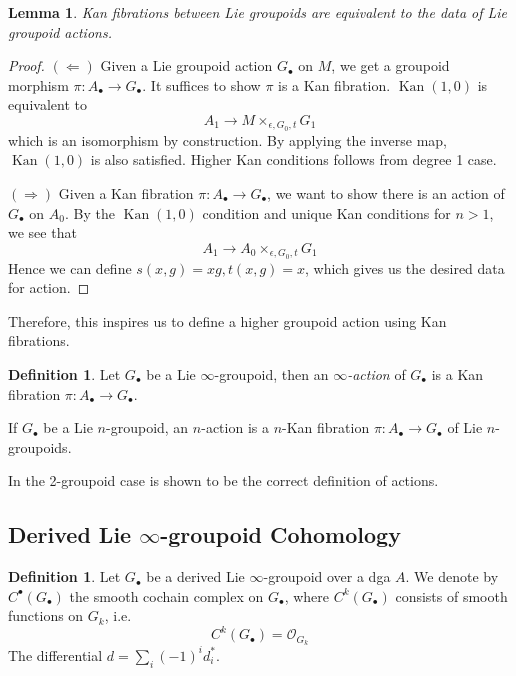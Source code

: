 \documentclass[12pt]{amsart}
\newtheorem{lem}[thm]{Lemma}
\theoremstyle{definition}
\newtheorem{defn}[thm]{Definition}
\theoremstyle{remark}
\numberwithin{equation}{section}
\newcommand{\CO}{{\mathcal O}}
\newcommand{\1}{{\mathbb{1}}}
\newcommand{\bt}{\bullet}
\newcommand{\kan}{\operatorname{Kan}}
\newcommand{\pr}{{\operatorname{pr}}}
\begin{document}
    	\begin{center}
\end{center}
\begin{lem}
    Kan fibrations between Lie groupoids are equivalent to the data of Lie groupoid actions.
\end{lem}
\begin{proof}
    $(\Leftarrow)$ Given a Lie groupoid action $G_{\bt}$ on $M$, we get a groupoid morphism $\pi: A_{\bt} \to G_{\bt}$. It suffices to show $\pi$ is a Kan fibration. $\kan(1,0)$ is equivalent to 
    $$A_1 \to M\times_{\epsilon, G_0, t} G_1
    $$
    which is an isomorphism by construction. By applying the inverse map, $\kan(1,0)$ is also satisfied. Higher Kan conditions follows from degree 1 case.
    
    $(\Rightarrow)$ Given a Kan fibration $\pi: A_{\bt} \to G_{\bt}$, we want to show there is an action of $G_{\bt}$ on $A_0$. By the $\kan(1,0)$ condition and unique Kan conditions for $n > 1$, we see that 
    $$A_1 \to A_0\times_{\epsilon, G_0, t} G_1$$
    Hence we can define $s(x, g) = xg, t(x, g) = x$, which gives us the desired data for  action.
\end{proof}
Therefore, this inspires us to define a higher groupoid action using Kan fibrations.

\begin{defn}
    Let $G_{\bt}$ be a Lie $\infty$-groupoid, then an {\it $\infty$-action} of $G_{\bt}$ is a Kan fibration $\pi: A_{\bt} \to G_{\bt}$.
    
    If $G_{\bt}$ be a Lie $n$-groupoid, an $n$-action is a $n$-Kan fibration $\pi:A_{\bt} \to G_{\bt}$ of Lie $n$-groupoids.
\end{defn}
In \cite{Li15} the 2-groupoid case is shown to be the correct definition of actions.
\subsection{Derived Lie $\infty$-groupoid Cohomology}
    \begin{defn}
        Let $G_{\bt}$ be a derived Lie $\infty$-groupoid over a dga $A$. We denote by $C^{\bt}(G_{\bt})$ the smooth cochain complex on $G_{\bt}$, where $C^k(G_{\bt})$ consists of smooth functions on $G_k$, i.e.
        \begin{equation*}
            C^k(G_{\bt}) = \CO_{G_k}
        \end{equation*}
        The differential $d = \sum_i(-1)^i d^*_i$.
    \end{defn}
                                                      
\end{document}
